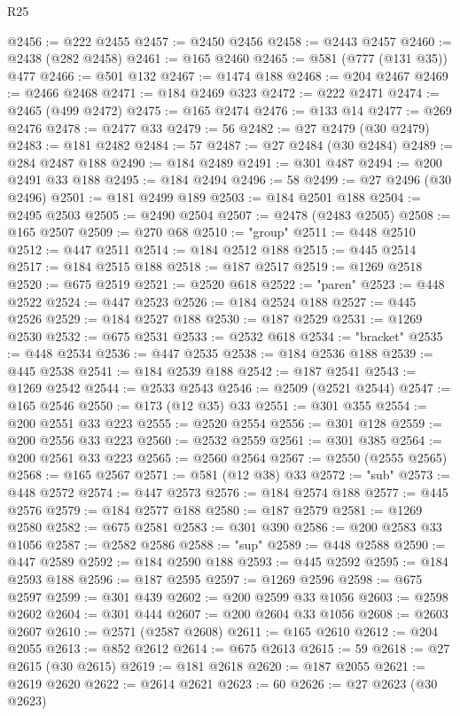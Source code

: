 \begin{lexlean}{R25}
\begin{coremodule}
@2456 := @222 @2455
@2457 := @2450 @2456
@2458 := @2443 @2457
@2460 := @2438 (@282 @2458)
@2461 := @165 @2460
@2465 := @581 (@777 (@131 @35)) @477
@2466 := @501 @132
@2467 := @1474 @188
@2468 := @204 @2467
@2469 := @2466 @2468
@2471 := @184 @2469 @323
@2472 := @222 @2471
@2474 := @2465 (@499 @2472)
@2475 := @165 @2474
@2476 := @133 @14
@2477 := @269 @2476
@2478 := @2477 @33
@2479 := 56
@2482 := @27 @2479 (@30 @2479)
@2483 := @181 @2482
@2484 := 57
@2487 := @27 @2484 (@30 @2484)
@2489 := @284 @2487 @188
@2490 := @184 @2489
@2491 := @301 @487
@2494 := @200 @2491 @33 @188
@2495 := @184 @2494
@2496 := 58
@2499 := @27 @2496 (@30 @2496)
@2501 := @181 @2499 @189
@2503 := @184 @2501 @188
@2504 := @2495 @2503
@2505 := @2490 @2504
@2507 := @2478 (@2483 @2505)
@2508 := @165 @2507
@2509 := @270 @68
@2510 := "group"
@2511 := @448 @2510
@2512 := @447 @2511
@2514 := @184 @2512 @188
@2515 := @445 @2514
@2517 := @184 @2515 @188
@2518 := @187 @2517
@2519 := @1269 @2518
@2520 := @675 @2519
@2521 := @2520 @618
@2522 := "paren"
@2523 := @448 @2522
@2524 := @447 @2523
@2526 := @184 @2524 @188
@2527 := @445 @2526
@2529 := @184 @2527 @188
@2530 := @187 @2529
@2531 := @1269 @2530
@2532 := @675 @2531
@2533 := @2532 @618
@2534 := "bracket"
@2535 := @448 @2534
@2536 := @447 @2535
@2538 := @184 @2536 @188
@2539 := @445 @2538
@2541 := @184 @2539 @188
@2542 := @187 @2541
@2543 := @1269 @2542
@2544 := @2533 @2543
@2546 := @2509 (@2521 @2544)
@2547 := @165 @2546
@2550 := @173 (@12 @35) @33
@2551 := @301 @355
@2554 := @200 @2551 @33 @223
@2555 := @2520 @2554
@2556 := @301 @128
@2559 := @200 @2556 @33 @223
@2560 := @2532 @2559
@2561 := @301 @385
@2564 := @200 @2561 @33 @223
@2565 := @2560 @2564
@2567 := @2550 (@2555 @2565)
@2568 := @165 @2567
@2571 := @581 (@12 @38) @33
@2572 := "sub"
@2573 := @448 @2572
@2574 := @447 @2573
@2576 := @184 @2574 @188
@2577 := @445 @2576
@2579 := @184 @2577 @188
@2580 := @187 @2579
@2581 := @1269 @2580
@2582 := @675 @2581
@2583 := @301 @390
@2586 := @200 @2583 @33 @1056
@2587 := @2582 @2586
@2588 := "sup"
@2589 := @448 @2588
@2590 := @447 @2589
@2592 := @184 @2590 @188
@2593 := @445 @2592
@2595 := @184 @2593 @188
@2596 := @187 @2595
@2597 := @1269 @2596
@2598 := @675 @2597
@2599 := @301 @439
@2602 := @200 @2599 @33 @1056
@2603 := @2598 @2602
@2604 := @301 @444
@2607 := @200 @2604 @33 @1056
@2608 := @2603 @2607
@2610 := @2571 (@2587 @2608)
@2611 := @165 @2610
@2612 := @204 @2055
@2613 := @852 @2612
@2614 := @675 @2613
@2615 := 59
@2618 := @27 @2615 (@30 @2615)
@2619 := @181 @2618
@2620 := @187 @2055
@2621 := @2619 @2620
@2622 := @2614 @2621
@2623 := 60
@2626 := @27 @2623 (@30 @2623)

\end{coremodule}
\end{lexlean}
